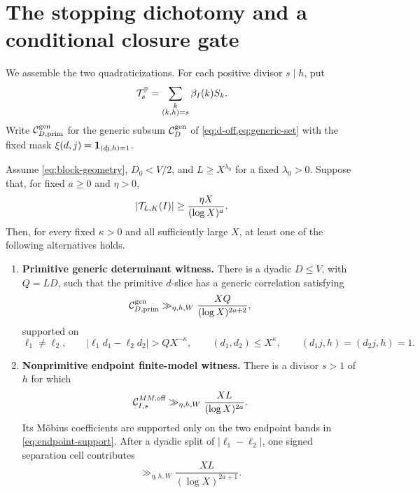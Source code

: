 \section{The stopping dichotomy and a conditional closure gate}
\label{sec:stopping}

We assemble the two quadraticizations.  For each positive divisor
$s\mid h$, put
\begin{equation}
 \mathcal T_s^{\mathbb P}
 =\sum_{\substack{k\\(k,h)=s}}\beta_I(k)S_k.
 \label{eq:sector-tail}
\end{equation}
Write $\mathcal C_{D,\mathrm{prim}}^{\mathrm{gen}}$ for the generic subsum
$\mathcal C_D^{\mathrm{gen}}$ of \cref{eq:d-off,eq:generic-set} with the
fixed mask $\xi(d,j)=\mathbf 1_{(dj,h)=1}$.

\begin{theorem}
\label{thm:stopping-dichotomy}
Assume \eqref{eq:block-geometry}, $D_0<V/2$, and
$L\ge X^{\lambda_0}$ for a fixed $\lambda_0>0$.  Suppose that, for
fixed $a\ge0$ and $\eta>0$,
\begin{equation}
 |\mathcal T_{L,K}(I)|\ge\frac{\eta X}{(\log X)^a}.
 \label{eq:tail-failure}
\end{equation}
Then, for every fixed $\kappa>0$ and all sufficiently large $X$, at
least one of the following alternatives holds.

\begin{enumerate}[label=\textup{(\Alph*)}]
\item \textbf{Primitive generic determinant witness.}
There is a dyadic $D\le V$, with $Q=LD$, such that the primitive
$d$-slice has a generic correlation satisfying
\begin{equation}
 \mathcal C_{D,\mathrm{prim}}^{\mathrm{gen}}
 \gg_{\eta,h,W}
 \frac{XQ}{(\log X)^{2a+2}},
 \label{eq:primitive-generic-dichotomy}
\end{equation}
supported on
\[
 \ell_1\ne\ell_2,\qquad
 |\ell_1d_1-\ell_2d_2|>QX^{-\kappa},\qquad
 (d_1,d_2)\le X^\kappa,\qquad
 (d_1j,h)=(d_2j,h)=1.
\]

\item \textbf{Nonprimitive endpoint finite-model witness.}
There is a divisor $s>1$ of $h$ for which
\begin{equation}
 \mathcal C_{I,s}^{MM,\mathrm{off}}
 \gg_{\eta,h,W}\frac{XL}{(\log X)^{2a}}.
 \label{eq:nonprimitive-dichotomy}
\end{equation}
Its M\"obius coefficients are supported only on the two endpoint
bands in \eqref{eq:endpoint-support}.  After a dyadic split of
$|\ell_1-\ell_2|$, one signed separation cell contributes
\begin{equation}
 \gg_{\eta,h,W}\frac{XL}{(\log X)^{2a+1}}.
 \label{eq:nonprimitive-Delta-cell}
\end{equation}
\end{enumerate}
\end{theorem}

